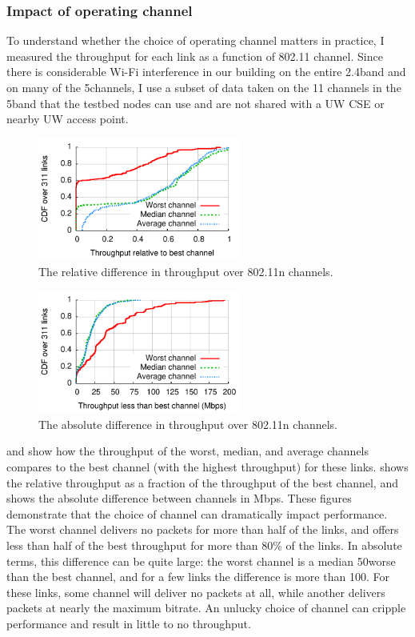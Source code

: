 \subsubsection{Impact of operating channel}
To understand whether the choice of operating channel matters in practice, I measured the throughput for each link as a function of 802.11 channel. Since there is considerable Wi-Fi interference in our building on the entire 2.4\GHz band and on many of the 5\GHz channels, I use a subset of data taken on the 11 channels in the 5\GHz band that the testbed nodes can use and are not shared with a UW CSE or nearby UW access point.

\begin{figure}[tp]
	\centering
	\includegraphics[width=0.6\textwidth]{figures/esnr/rel_diff.pdf}
	\caption{\label{fig:rel_diff}The relative difference in throughput over 802.11n channels.}
\end{figure}

\begin{figure}[tp]
	\centering
	\includegraphics[width=0.6\textwidth]{figures/esnr/tpt_diff.pdf}
	\caption{\label{fig:tpt_diff}The absolute difference in throughput over 802.11n channels.}
\end{figure}

 and  show how the throughput of the worst, median, and average channels compares to the best channel (with the highest throughput) for these links.  shows the relative throughput as a fraction of the throughput of the best channel, and  shows the absolute difference between channels in Mbps. These figures demonstrate that the choice of channel can dramatically impact performance. The worst channel delivers no packets for more than half of the links, and offers less than half of the best throughput for more than 80\% of the links. In absolute terms, this difference can be quite large: the worst channel is a median 50\Mbps worse than the best channel, and for a few links the difference is more than 100\Mbps. For these links, some channel will deliver no packets at all, while another delivers packets at nearly the maximum bitrate. An unlucky choice of channel can cripple performance and result in little to no throughput.

